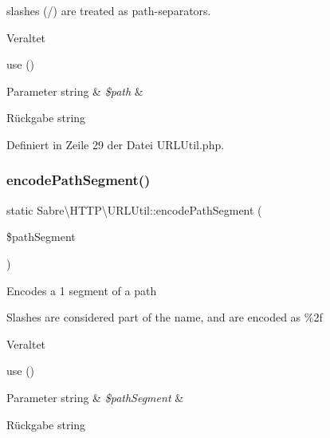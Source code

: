 slashes (/) are treated as path-\/separators.

\begin{DoxyRefDesc}{Veraltet}
\item[\mbox{\hyperlink{deprecated__deprecated000050}{Veraltet}}]use () \end{DoxyRefDesc}

\begin{DoxyParams}[1]{Parameter}
string & {\em \$path} & \\
\hline
\end{DoxyParams}
\begin{DoxyReturn}{Rückgabe}
string 
\end{DoxyReturn}


Definiert in Zeile 29 der Datei U\+R\+L\+Util.\+php.

\mbox{\label{class_sabre_1_1_h_t_t_p_1_1_u_r_l_util_a4d6021bd8769a7c801f83333a79f8e19}} 
\subsubsection{\texorpdfstring{encode\+Path\+Segment()}{encodePathSegment()}}
{\footnotesize\ttfamily static Sabre\textbackslash{}\+H\+T\+T\+P\textbackslash{}\+U\+R\+L\+Util\+::encode\+Path\+Segment (\begin{DoxyParamCaption}\item[{}]{\$path\+Segment }\end{DoxyParamCaption})\hspace{0.3cm}{\ttfamily [static]}}

Encodes a 1 segment of a path

Slashes are considered part of the name, and are encoded as \%2f

\begin{DoxyRefDesc}{Veraltet}
\item[\mbox{\hyperlink{deprecated__deprecated000051}{Veraltet}}]use () \end{DoxyRefDesc}

\begin{DoxyParams}[1]{Parameter}
string & {\em \$path\+Segment} & \\
\hline
\end{DoxyParams}
\begin{DoxyReturn}{Rückgabe}
string 
\end{DoxyReturn}


